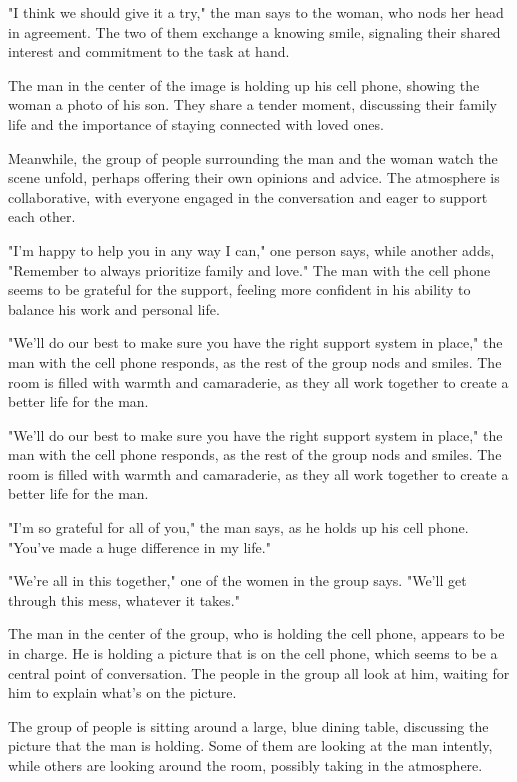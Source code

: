 \documentclass[smalldemyvopaper,11pt,twoside,onecolumn,openright,extrafontsizes]{memoir}
\begin{document}
"I think we should give it a try," the man says to the woman, who nods her head in agreement. The two of them exchange a knowing smile, signaling their shared interest and commitment to the task at hand.\par
The man in the center of the image is holding up his cell phone, showing the woman a photo of his son. They share a tender moment, discussing their family life and the importance of staying connected with loved ones.\par
Meanwhile, the group of people surrounding the man and the woman watch the scene unfold, perhaps offering their own opinions and advice. The atmosphere is collaborative, with everyone engaged in the conversation and eager to support each other.\par
"I'm happy to help you in any way I can," one person says, while another adds, "Remember to always prioritize family and love." The man with the cell phone seems to be grateful for the support, feeling more confident in his ability to balance his work and personal life.\par
"We'll do our best to make sure you have the right support system in place," the man with the cell phone responds, as the rest of the group nods and smiles. The room is filled with warmth and camaraderie, as they all work together to create a better life for the man.\par
"We'll do our best to make sure you have the right support system in place," the man with the cell phone responds, as the rest of the group nods and smiles. The room is filled with warmth and camaraderie, as they all work together to create a better life for the man.\par
"I'm so grateful for all of you," the man says, as he holds up his cell phone. "You've made a huge difference in my life."\par
"We're all in this together," one of the women in the group says. "We'll get through this mess, whatever it takes."\par
The man in the center of the group, who is holding the cell phone, appears to be in charge. He is holding a picture that is on the cell phone, which seems to be a central point of conversation. The people in the group all look at him, waiting for him to explain what's on the picture.\par
The group of people is sitting around a large, blue dining table, discussing the picture that the man is holding. Some of them are looking at the man intently, while others are looking around the room, possibly taking in the atmosphere.\par
\end{document}
